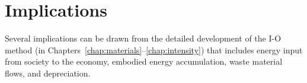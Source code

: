 %
%
%

\chapter{Implications}
\label{chap:implications}





Several implications can be drawn from the detailed development 
of the I-O method 
(in Chapters~\ref{chap:materials}--\ref{chap:intensity})
that includes energy input from society to the economy,
embodied energy accumulation, waste material flows, and depreciation.


